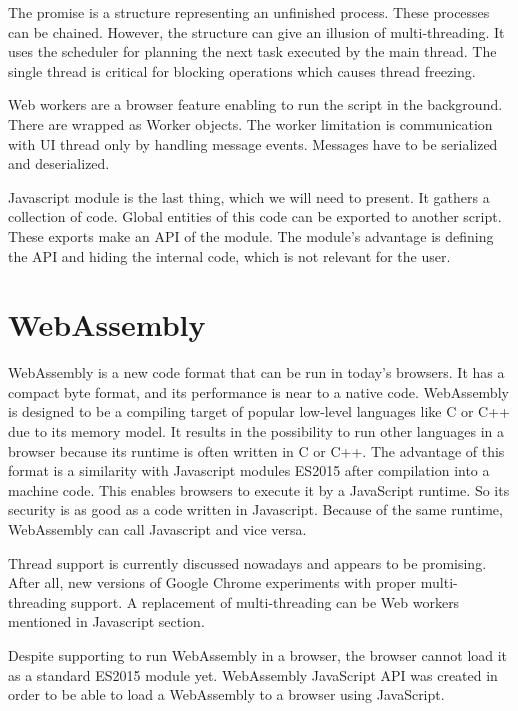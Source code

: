 The promise is a structure representing an unfinished process.
These processes can be chained.
However, the structure can give an illusion of multi-threading. It uses the scheduler for planning the next task executed by the main thread.
The single thread is critical for blocking operations which causes thread freezing.
\par
Web workers  are a browser feature enabling to run the script in the background.
There are wrapped as Worker objects.
The worker limitation is communication with UI thread only by handling message events. 
Messages have to be serialized and deserialized.
\par
{}
Javascript module is the last thing, which we will need to present.
It gathers a collection of code.
Global entities of this code can be exported to another script.
These exports make an API of the module.
The module's advantage is defining the API and hiding the internal code, which is not relevant for the user.
\section{WebAssembly}

WebAssembly  is a new code format that can be run in today's browsers. 
It has a compact byte format, and its performance is near to a native code. 
WebAssembly is designed to be a compiling target of popular low-level languages like C or C++ due to its memory model.
It results in the possibility to run other languages in a browser because its runtime is often written in C or C++. 
The advantage of this format is a similarity with Javascript modules ES2015 after compilation into a machine code. 
This enables browsers to execute it by a JavaScript runtime. 
So its security is as good as a code written in Javascript. 
Because of the same runtime, WebAssembly can call Javascript and vice versa.
\par
{}
Thread  support is currently discussed nowadays and appears to be promising.
After all, new versions of Google Chrome experiments with proper multi-threading support.
A replacement of multi-threading can be Web workers mentioned in Javascript section.
\par
Despite supporting to run WebAssembly in a browser, the browser cannot load it as a standard ES2015 module yet.
WebAssembly JavaScript API was created in order to be able to load a WebAssembly to a browser using JavaScript.

